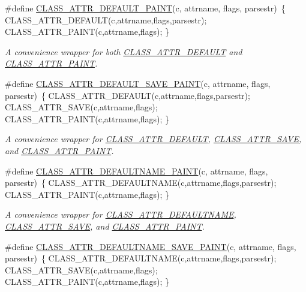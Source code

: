 \begin{DoxyCompactItemize}
\#define \hyperlink{group__attr_gabb817cf3673852f60f14ee635faa5e17}{CLASS\_\-ATTR\_\-DEFAULT\_\-PAINT}(c, attrname, flags, parsestr)~\{ CLASS\_\-ATTR\_\-DEFAULT(c,attrname,flags,parsestr); CLASS\_\-ATTR\_\-PAINT(c,attrname,flags); \}
\begin{DoxyCompactList}\small\item\em A convenience wrapper for both \hyperlink{group__attr_ga91196b43f49d6769e6fe2df99f5c7c77}{CLASS\_\-ATTR\_\-DEFAULT} and \hyperlink{group__attr_gaee847156d2c156b4c9f73652b6059500}{CLASS\_\-ATTR\_\-PAINT}. \item\end{DoxyCompactList}\item 
\#define \hyperlink{group__attr_ga55677c851b0822e7852dc3742046b77c}{CLASS\_\-ATTR\_\-DEFAULT\_\-SAVE\_\-PAINT}(c, attrname, flags, parsestr)~\{ CLASS\_\-ATTR\_\-DEFAULT(c,attrname,flags,parsestr); CLASS\_\-ATTR\_\-SAVE(c,attrname,flags); CLASS\_\-ATTR\_\-PAINT(c,attrname,flags); \}
\begin{DoxyCompactList}\small\item\em A convenience wrapper for \hyperlink{group__attr_ga91196b43f49d6769e6fe2df99f5c7c77}{CLASS\_\-ATTR\_\-DEFAULT}, \hyperlink{group__attr_gaf56dc31d0defad3cdc1ee60b611acc79}{CLASS\_\-ATTR\_\-SAVE}, and \hyperlink{group__attr_gaee847156d2c156b4c9f73652b6059500}{CLASS\_\-ATTR\_\-PAINT}. \item\end{DoxyCompactList}\item 
\#define \hyperlink{group__attr_ga4bb21babfd8b2152c9ab9bcc511e0756}{CLASS\_\-ATTR\_\-DEFAULTNAME\_\-PAINT}(c, attrname, flags, parsestr)~\{ CLASS\_\-ATTR\_\-DEFAULTNAME(c,attrname,flags,parsestr); CLASS\_\-ATTR\_\-PAINT(c,attrname,flags); \}
\begin{DoxyCompactList}\small\item\em A convenience wrapper for \hyperlink{group__attr_gaf6ee00a905a84d18172a212667cfa4cb}{CLASS\_\-ATTR\_\-DEFAULTNAME}, \hyperlink{group__attr_gaf56dc31d0defad3cdc1ee60b611acc79}{CLASS\_\-ATTR\_\-SAVE}, and \hyperlink{group__attr_gaee847156d2c156b4c9f73652b6059500}{CLASS\_\-ATTR\_\-PAINT}. \item\end{DoxyCompactList}\item 
\#define \hyperlink{group__attr_gaa341fe624851ca5eda03361822bb5e33}{CLASS\_\-ATTR\_\-DEFAULTNAME\_\-SAVE\_\-PAINT}(c, attrname, flags, parsestr)~\{ CLASS\_\-ATTR\_\-DEFAULTNAME(c,attrname,flags,parsestr); CLASS\_\-ATTR\_\-SAVE(c,attrname,flags); CLASS\_\-ATTR\_\-PAINT(c,attrname,flags); \}

\end{DoxyCompactItemize}
